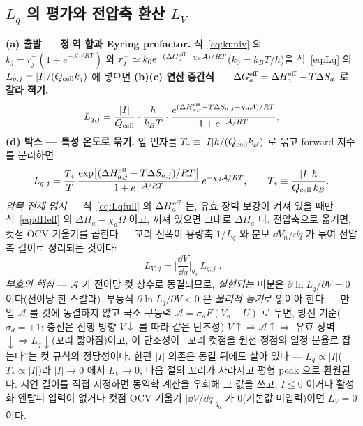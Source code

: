 \subsection{$L_q$ 의 평가와 전압축 환산 $L_V$}\label{sec:lag-LV}
\textbf{(a) 출발 --- 정$\cdot$역 합과 Eyring prefactor.} 식~\eqref{eq:kuniv} 의 $k_j=r_j^+(1+e^{-\mathcal A_j/RT})$ 와
$r_j^+\simeq k_0e^{-(\Delta G_a^{\mathrm{eff}}-\chi_d\mathcal A)/RT}$($k_0=k_BT/h$)을 식~\eqref{eq:Lq} 의 $L_{q,j}=|I|/(Q_{\mathrm{cell}} k_j)$
에 넣으면 \textbf{(b)(c) 연산$\cdot$중간식 --- $\Delta G_a^{\mathrm{eff}}=\Delta H_a^{\mathrm{eff}}-T\Delta S_a$ 로 갈라 적기.}
\begin{equation}
L_{q,j}=\frac{|I|}{Q_{\mathrm{cell}}}\cdot\frac{h}{k_BT}\cdot
\frac{e^{(\Delta H_{a,j}^{\mathrm{eff}}-T\Delta S_{a,j}-\chi_d\mathcal A)/RT}}{1+e^{-\mathcal A/RT}},
\label{eq:Lqmid2}
\end{equation}
\textbf{(d) 박스 --- 특성 온도로 묶기.} 앞 인자를 $T_*\equiv|I|h/(Q_{\mathrm{cell}} k_B)$ 로 묶고 forward 지수를 분리하면
\begin{equation}
L_{q,j}=\frac{T_*}{T}\,\frac{\exp\!\big[(\Delta H_{a,j}^{\mathrm{eff}}-T\Delta S_{a,j})/RT\big]}{1+e^{-\mathcal A/RT}}
\,e^{-\chi_d\mathcal A/RT},
\qquad T_*\equiv\frac{|I|\,h}{Q_{\mathrm{cell}}\,k_B}.
\label{eq:Lqfull}
\end{equation}
\emph{암묵 전제 명시} --- 식~\eqref{eq:Lqfull} 의
$\Delta H_a^{\mathrm{eff}}$ 는, 유효 장벽 보강이 켜져 있을 때만 식~\eqref{eq:dHeff} 의 $\Delta H_a-\chi_d\Omega$ 이고,
꺼져 있으면 그대로 $\Delta H_a$ 다. 전압축으로 옮기면, 컷점 OCV 기울기를 곱한다 --- 꼬리 진폭이
용량축 $1/L_q$ 와 분모 $\dd V_n/\dd q$ 가 묶여 전압축 길이로 정리되는 것이다:
\begin{equation}
\boxed{\;L_{V,j}=\Big|\frac{\dd V}{\dd q}\Big|_{q_a}\,L_{q,j}\;.}
\label{eq:LV}
\end{equation}
\emph{부호의 핵심} --- $\mathcal A$ 가 전이당 컷 상수로 동결되므로, \emph{실현되는} 미분은
$\partial\ln L_q/\partial V=0$ 이다(전이당 한 스칼라). 부등식 $\partial\ln L_q/\partial V<0$ 은 \emph{물리적 동기}로 읽어야
한다 --- 만일 $\mathcal A$ 를 컷에 동결하지 않고 국소 구동력 $\mathcal A=\sigma_dF(V_n-U)$ 로 두면, 방전
기준($\sigma_d=+1$; 충전은 진행 방향 $V\!\downarrow$ 를 따라 같은 단조성) $V\!\uparrow\Rightarrow
\mathcal A\!\uparrow\Rightarrow$ 유효 장벽$\downarrow\Rightarrow L_q\downarrow$(꼬리 짧아짐)이고, 이 단조성이 ``꼬리 컷점을
원천 정점의 일정 분율로 잡는다''는 컷 규칙의 정당성이다. 한편 $|I|$ 의존은 동결 뒤에도 살아 있다 --- $L_q\propto|I|$($T_*\propto|I|$)라 $|I|\to0$
에서 $L_V\to0$, 다음 절의 꼬리가 사라지고 평형 peak 으로 환원된다. 지연 길이를 직접 지정하면 동역학 계산을 우회해
그 값을 쓰고, $I\le0$ 이거나 활성화 엔탈피 입력이 없거나 컷점 OCV 기울기 $|\dd V/\dd q|_{q_a}$ 가
$0$(기본값$\cdot$미입력)이면 $L_V=0$ 이다.

